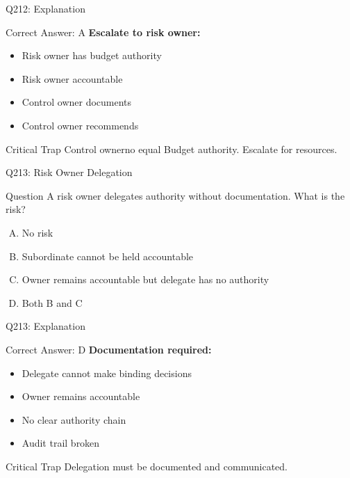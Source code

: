 \documentclass{beamer}
\begin{document}
	\begin{frame}{Q212: Explanation}
		\begin{block}{Correct Answer: A}
			\textbf{Escalate to risk owner:}
			\begin{itemize}
				\item Risk owner has budget authority
				\item Risk owner accountable
				\item Control owner documents
				\item Control owner recommends
			\end{itemize}
		\end{block}
		\begin{alertblock}{Critical Trap}
			Control ownerno equal Budget authority.
			Escalate for resources.
		\end{alertblock}
	\end{frame}
	
	\begin{frame}{Q213: Risk Owner Delegation}
		\begin{block}{Question}
			A risk owner delegates authority without documentation. What is the risk?
		\end{block}
		\begin{enumerate}[(A)]
			\item No risk
			\item Subordinate cannot be held accountable
			\item Owner remains accountable but delegate has no authority
			\item Both B and C
		\end{enumerate}
	\end{frame}
	
	\begin{frame}{Q213: Explanation}
		\begin{block}{Correct Answer: D}
			\textbf{Documentation required:}
			\begin{itemize}
				\item Delegate cannot make binding decisions
				\item Owner remains accountable
				\item No clear authority chain
				\item Audit trail broken
			\end{itemize}
		\end{block}
		\begin{alertblock}{Critical Trap}
			Delegation must be documented and communicated.
		\end{alertblock}
	\end{frame}
	
\end{document}
